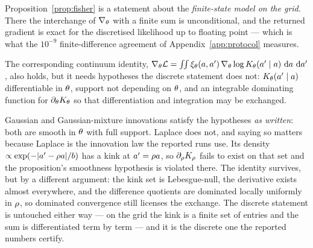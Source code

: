 
\begin{remark}
\label{rem:fisher-scope}
Proposition~\ref{prop:fisher} is a statement about the \emph{finite-state model on the grid}. There
the interchange of $\nabla_\theta$ with a finite sum is unconditional, and the returned gradient
is exact for the discretised likelihood up to floating point --- which is what the
$10^{-9}$ finite-difference agreement of Appendix~\ref{app:protocol} measures.

The corresponding continuum identity,
$\nabla_\theta \mathcal{L} = \int\!\!\int \xi_\theta(a,a')\,\nabla_\theta \log
K_\theta(a'\mid a)\,\,\mathrm{d} a\,\,\mathrm{d} a'$, also holds, but it needs hypotheses the discrete
statement does not: $K_\theta(a'\mid a)$ differentiable in $\theta$, support not depending
on $\theta$, and an integrable dominating function for $\partial_\theta K_\theta$ so that
differentiation and integration may be exchanged.

Gaussian and Gaussian-mixture innovations satisfy the hypotheses \emph{as written}: both are
smooth in $\theta$ with full support. Laplace does not, and saying so matters because Laplace is
the innovation law the reported runs use. Its density $\propto \exp(-|a'-\rho a|/b)$ has a kink
at $a'=\rho a$, so $\partial_\rho K_\rho$ fails to exist on that set and the proposition's
smoothness hypothesis is violated there. The identity survives, but by a different argument: the
kink set is Lebesgue-null, the derivative exists almost everywhere, and the difference quotients
are dominated locally uniformly in $\rho$, so dominated convergence still licenses the exchange.
The discrete statement is untouched either way --- on the grid the kink is a finite set of entries
and the sum is differentiated term by term --- and it is the discrete one the reported numbers
certify.
\end{remark}
